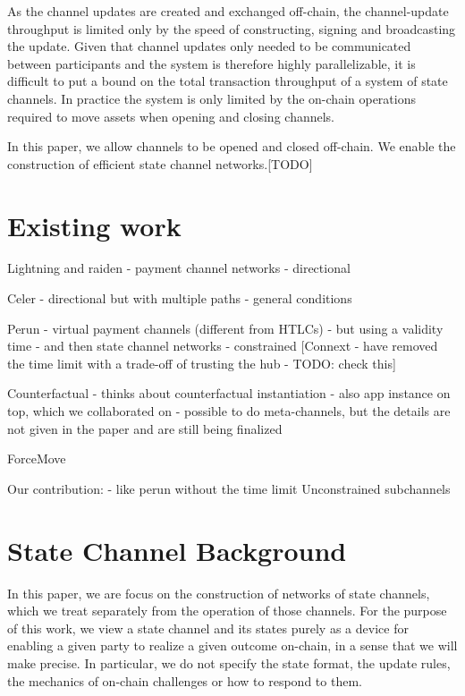 \documentclass{article}
\begin{document}
As the channel updates are created and exchanged off-chain, the channel-update throughput is limited only by the speed of constructing, signing and broadcasting the update.
Given that channel updates only needed to be communicated between participants and the system is therefore highly parallelizable, it is difficult to put a bound on the total transaction throughput of a system of state channels.
In practice the system is only limited by the on-chain operations required to move assets when opening and closing channels.

In this paper, we allow channels to be opened and closed off-chain. We enable the construction of efficient state channel networks.[TODO]

\section{Existing work}

Lightning and raiden
- payment channel networks
- directional

Celer
- directional but with multiple paths
- general conditions

Perun
- virtual payment channels (different from HTLCs)
- but using a validity time
- and then state channel networks
- constrained
[Connext - have removed the time limit with a trade-off of trusting the hub - TODO: check this]

Counterfactual
- thinks about counterfactual instantiation
- also app instance on top, which we collaborated on
- possible to do meta-channels, but the details are not given in the paper and are still being finalized

ForceMove

Our contribution:
- like perun without the time limit
Unconstrained subchannels

\section{State Channel Background}

In this paper, we are focus on the construction of networks of state channels, which we treat separately from the operation of those channels.
For the purpose of this work, we view a state channel and its states purely as a device for enabling a given party to realize a given outcome on-chain, in a sense that we will make precise.
In particular, we do not specify the state format, the update rules, the mechanics of on-chain challenges or how to respond to them.
\end{document}
